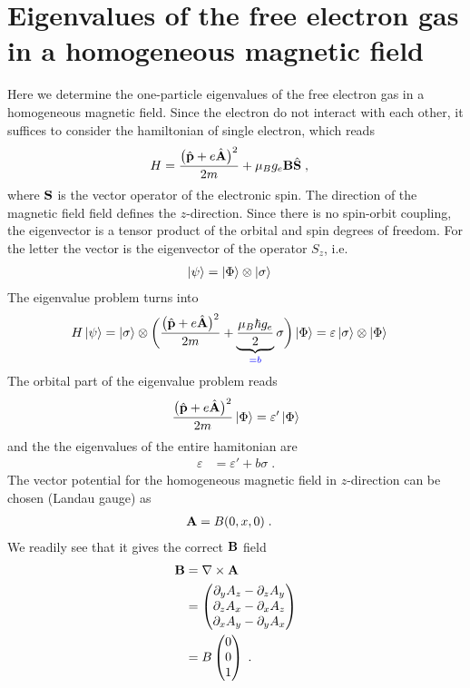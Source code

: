\section{Eigenvalues of the free electron gas in a homogeneous magnetic field}
Here we determine the one-particle eigenvalues of
 the free electron gas in a homogeneous magnetic field. Since the electron do not interact
 with each other, it suffices to consider the hamiltonian of  single electron, which
reads
%
\begin{align*}
H &= \frac{\big( \hat{\mathbf p} +e \hat{\mathbf A} \big)^{2}}{2m} + \mu_{B} g_{e} \mathbf B \hat{\mathbf S}\;,
\end{align*}
%
where $\mathbf S$ is the vector operator of the electronic spin. The direction of the magnetic field
field defines the $z$-direction. Since there is no spin-orbit coupling, the eigenvector is a tensor product of the  orbital and spin degrees of freedom. For the letter the vector is the eigenvector
of the operator $S_{z}$, i.e.
%
\begin{align*}
\ket{\psi} &= \ket{\Phi}\otimes \ket{\sigma}
\end{align*}
%
The eigenvalue problem turns into
%
\begin{align*}
H\ket{\psi} &= \ket{\sigma} \otimes\bigg( \frac{\big( \hat{\mathbf p} +e \hat{\mathbf A} \big)^{2}}{2m} 
+ \underbrace{
\frac{\mu_{B}\hbar g_{e}}{2}
}_{\color{blue} = b} \sigma \bigg)\ket{\Phi} = \varepsilon \ket{\sigma}\otimes\ket{\Phi}
\end{align*}
%
The orbital part of the eigenvalue problem reads
\begin{align*}
 \frac{\big( \hat{\mathbf p} +e \hat{\mathbf A} \big)^{2}}{2m} \ket{\Phi} =\varepsilon' \ket{\Phi}
\end{align*}
and the the eigenvalues of the entire hamitonian are
%
\begin{align*}
\varepsilon &= \varepsilon' + b\sigma\;.
\end{align*}
%
The vector potential for the homogeneous magnetic field in $z$-direction can be chosen (Landau gauge) as
%
\begin{align*}
\mathbf A &= B (0,x,0)\;.
\end{align*}
%
We readily see that it gives the correct $\mathbf B$ field
%
\begin{align*}
\mathbf B &=\nabla \times \mathbf A \\
&= 
\begin{pmatrix}
	\partial_{y} A_{z}  - 	\partial_{z} A_{y}\\
		\partial_{z} A_{x}  - 	\partial_{x} A_{z}\\
			\partial_{x} A_{y}  - 	\partial_{y} A_{x}
\end{pmatrix}\\
&= B 
\begin{pmatrix}
	0\\
	0\\
	1
\end{pmatrix}\;.
\end{align*}
